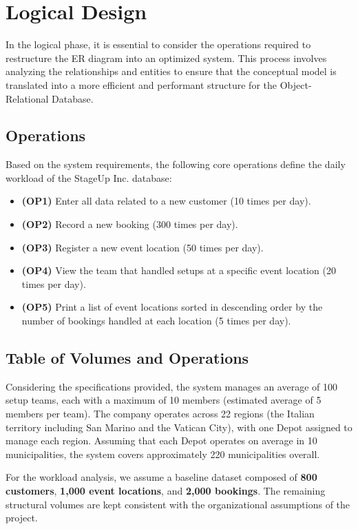 \documentclass[12pt,a4paper]{article}
\begin{document}
\section{Logical Design}

In the logical phase, it is essential to consider the operations required to restructure the ER diagram into an optimized system. This process involves analyzing the relationships and entities to ensure that the conceptual model is translated into a more efficient and performant structure for the Object-Relational Database.

\subsection{Operations}
Based on the system requirements, the following core operations define the daily workload of the StageUp Inc. database:

\begin{itemize}
    \item \textbf{(OP1)} Enter all data related to a new customer (10 times per day).
    \item \textbf{(OP2)} Record a new booking (300 times per day).
    \item \textbf{(OP3)} Register a new event location (50 times per day).
    \item \textbf{(OP4)} View the team that handled setups at a specific event location (20 times per day).
    \item \textbf{(OP5)} Print a list of event locations sorted in descending order by the number of bookings handled at each location (5 times per day).
\end{itemize}

\subsection{Table of Volumes and Operations}

Considering the specifications provided, the system manages an average of 100 setup teams, each with a maximum of 10 members (estimated average of 5 members per team). The company operates across 22 regions (the Italian territory including San Marino and the Vatican City), with one Depot assigned to manage each region. Assuming that each Depot operates on average in 10 municipalities, the system covers approximately 220 municipalities overall.

For the workload analysis, we assume a baseline dataset composed of \textbf{800 customers}, \textbf{1,000 event locations}, and \textbf{2,000 bookings}. The remaining structural volumes are kept consistent with the organizational assumptions of the project.
\end{document}
